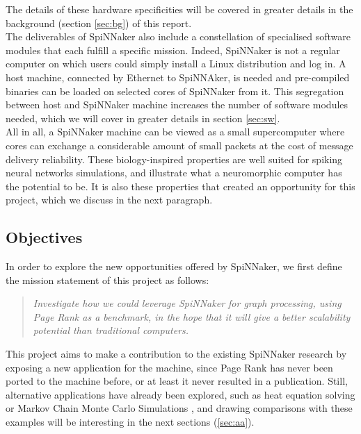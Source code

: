 The details of these hardware specificities will be covered in greater details in the background (section \ref{sec:bg}) of this report. \\

The deliverables of SpiNNaker also include a constellation of specialised software modules that each fulfill a specific mission. Indeed, SpiNNaker is not a regular computer on which users could simply install a Linux distribution and log in. A host machine, connected by Ethernet to SpiNNAker, is needed and pre-compiled binaries can be loaded on selected cores of SpiNNaker from it. This segregation between host and SpiNNaker machine increases the number of software modules needed, which we will cover in greater details in section \ref{sec:sw}. \\

All in all, a SpiNNaker machine can be viewed as a small supercomputer where cores can exchange a considerable amount of small packets at the cost of message delivery reliability. These biology-inspired properties are well suited for spiking neural networks simulations, and illustrate what a neuromorphic computer has the potential to be. It is also these properties that created an opportunity for this project, which we discuss in the next paragraph. \\


\subsection{Objectives}

In order to explore the new opportunities offered by SpiNNaker, we first define the mission statement of this project as follows:

\begin{quote}
\textit{Investigate how we could leverage SpiNNaker for graph processing, using Page Rank as a benchmark, in the hope that it will give a better scalability potential than traditional computers.
}\end{quote}

This project aims to make a contribution to the existing SpiNNaker research by exposing a new application for the machine, since Page Rank has never been ported to the machine before, or at least it never resulted in a publication. Still, alternative applications have already been explored, such as heat equation solving \cite{heat} or Markov Chain Monte Carlo Simulations \cite{markov-on-spinn}, and drawing comparisons with these examples will be interesting in the next sections (\ref{sec:aa}). \\

